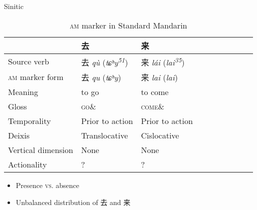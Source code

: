 \documentclass[xcolor=table]{beamer}
\newcommand{\ipa}[1]{{\phon\textit{#1}}}
\newcommand{\zh}[1]{{\cn #1}}
\begin{document}
\begin{frame}{Sinitic}
\begin{table} [H]
\caption{\textsc{am} marker in Standard Mandarin} \centering
\begin{tabular}{llllllllll}
\hline
& \zh{去} & \zh{来}  \\
\hline
Source verb & \zh{去} \ipa{qù} (\ipa{tɕʰy\textsuperscript{51}}) &  \zh{来} \ipa{lái} (\ipa{lai\textsuperscript{35}}) \\
\textsc{am} marker form & \zh{去} \ipa{qu} (\ipa{tɕʰy}) &  \zh{来} \ipa{lai} (\ipa{lai}) \\
Meaning & to go  & to come  \\
Gloss & \textsc{go}$\&$ & \textsc{come}$\&$ \\
Temporality  &  Prior to action & Prior to action \\
Deixis & Translocative & Cislocative  \\
Vertical dimension & None & None \\
Actionality & ? & ?  \\
\hline
\end{tabular}
\end{table}

\begin{itemize}
\item Presence \textsc{vs.} absence
\item Unbalanced distribution of \zh{去} and \zh{来}
\end{itemize}

\end{frame}
\end{document}
